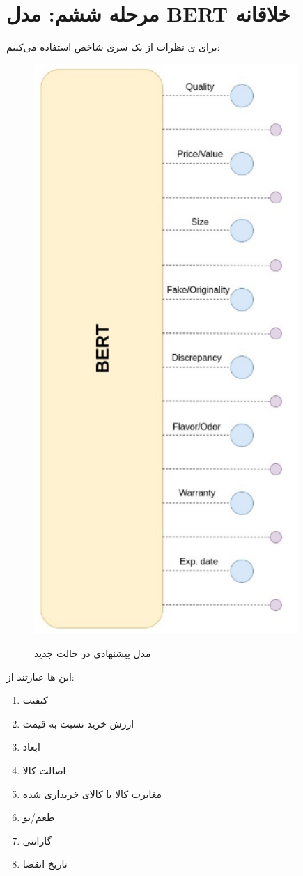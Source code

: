 \section{مرحله ششم: مدل BERT خلاقانه}

برای 
ی نظرات از یک سری شاخص استفاده می‌کنیم:

\begin{figure}[H]
\centering
\caption{مدل پیشنهادی در حالت جدید}\label{}
\includegraphics[width=10cm]{figs/bert_model.png}
\label{fig:test}
\end{figure}

این ها عبارتند از:
\begin{enumerate}
    \item کیفیت
    \item ارزش خرید نسبت به قیمت
    \item ابعاد
    \item اصالت کالا
    \item مغایرت کالا با کالای خریداری شده
    \item طعم/بو
    \item گارانتی
    \item تاریخ انقضا
\end{enumerate}


